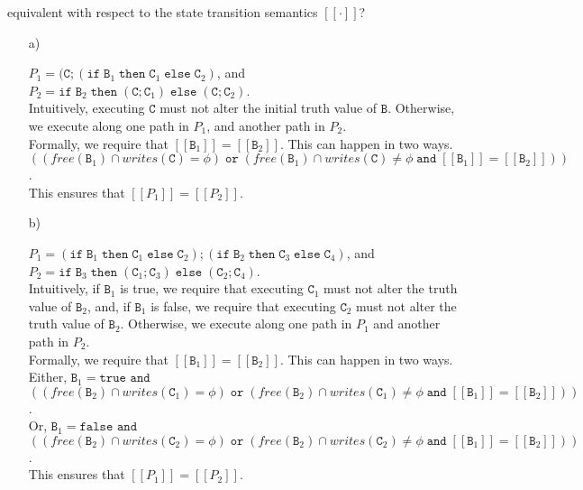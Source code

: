 \documentclass{article}
\newcommand{\B}{\mathtt{B}}
\newcommand{\C}{\mathtt{C}}
\newcommand{\true}{\mathtt{true}}
\newcommand{\false}{\mathtt{false}}
\newcommand{\andsym}{\mathtt{and}}
\newcommand{\orsym}{\mathtt{or}}
\newcommand{\ifsym}{\mathtt{if}}
\newcommand{\then}{\mathtt{then}}
\newcommand{\elsesym}{\mathtt{else}}
\begin{document}
\begin{enumerate}
{equivalent with respect to the state transition semantics $[[\cdot]]$?
}

\begin{enumerate}
  
\item[a)] 

$P_1 = (\C;(\ifsym \; \B_1 \; \then\; \C_1\; \elsesym \; \C_2)$, and\\
$P_2 = \ifsym \; \B_2 \; \then\; (\C; \C_1) \; \elsesym \; (\C; \C_2)$.\\

Intuitively, executing $\C$ must not alter the initial truth value of $\B$.
Otherwise, we execute along one path in $P_1$, and another path in $P_2$. \\

Formally, we require that $[[\B_1]] = [[\B_2]]$. 
This can happen in two ways. 
$( (free(\B_1) \cap writes(\C) = \phi) \; \orsym \; ( free(\B_1) \cap
writes(\C) \neq \phi \; \andsym \; [[\B_1]] = [[\B_2]]) )$.\\

This ensures that $[[P_1]] = [[P_2]]$. \\

\item[b)] 

$P_1 = (\ifsym \; \B_1 \; \then\; \C_1 \; \elsesym \; \C_2); (\ifsym \; \B_2 \;
\then \; \C_3 \; \elsesym \; \C_4)$, and\\
$P_2 = \ifsym \; \B_3 \; \then\; (\C_1;\C_3) \; \elsesym \; (\C_2;\C_4)$.\\

Intuitively, if $\B_1$ is true, we require that
executing $\C_1$ must not alter the truth value of $\B_2$, and, 
if $\B_1$ is false, we require that executing 
$\C_2$ must not alter the truth value of $\B_2$.
Otherwise, we execute along one path in $P_1$ and another path in $P_2$. \\

Formally, we require that $[[\B_1]] = [[\B_2]]$. This can happen in two ways.
Either, $\B_1 = \true$ $\andsym$ 
$( (free(\B_2) \cap writes(\C_1) = \phi) \; \orsym \; ( free(\B_2) \cap
writes(\C_1) \neq \phi \; \andsym \; [[\B_1]] = [[\B_2]]) )$.\\
Or, $\B_1 = \false$ $\andsym$ 
$( (free(\B_2) \cap writes(\C_2) = \phi) \; \orsym \; ( free(\B_2) \cap
writes(\C_2) \neq \phi \; \andsym \; [[\B_1]] = [[\B_2]]) )$.\\

This ensures that $[[P_1]] = [[P_2]]$.\\


\end{enumerate}
\end{enumerate}
\end{document}
